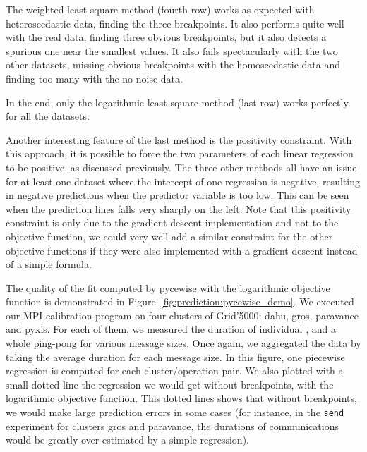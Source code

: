                 The weighted least square method (fourth row) works as expected with heteroscedastic data, finding the
                three breakpoints. It also performs quite well with the real data, finding three obvious breakpoints,
                but it also detects a spurious one near the smallest values. It also fails spectacularly with the two
                other datasets, missing obvious breakpoints with the homoscedastic data and finding too many with the
                no-noise data.

                In the end, only the logarithmic least square method (last row) works perfectly for all the datasets.

                Another interesting feature of the last method is the positivity constraint. With this approach, it is
                possible to force the two parameters of each linear regression to be positive, as discussed previously.
                The three other methods all have an issue for at least one dataset where the intercept of one regression
                is negative, resulting in negative predictions when the predictor variable is too low. This can be seen
                when the prediction lines falls very sharply on the left. Note that this positivity constraint is only
                due to the gradient descent implementation and not to the objective function, we could very well
                add a similar constraint for the other objective functions if they were also implemented with a gradient
                descent instead of a simple formula.

                The quality of the fit computed by pycewise with the logarithmic objective function is demonstrated in
                Figure~\ref{fig:prediction:pycewise_demo}. We executed our MPI calibration program on four clusters of
                Grid'5000: dahu, gros, paravance and pyxis. For each of them, we measured the duration of individual
                \recv, \send and a whole ping-pong for various message sizes. Once again, we aggregated the data by
                taking the average duration for each message size. In this figure, one piecewise regression is computed
                for each cluster/operation pair. We also plotted with a small dotted line the regression we would get
                without breakpoints, with the logarithmic objective function. This dotted lines shows that without
                breakpoints, we would make large prediction errors in some cases (for instance, in the \texttt{send}
                experiment for clusters gros and paravance, the durations of  communications would
                be greatly over-estimated by a simple regression).


